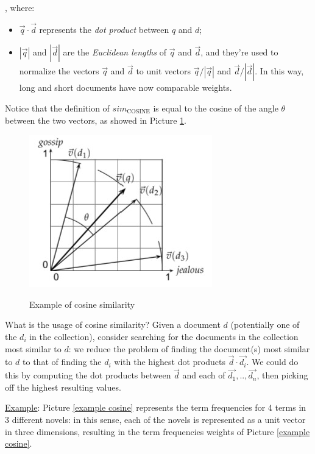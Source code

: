 , where:

\begin{itemize}
    \item $\Vec{q} \cdot \Vec{d}$ represents the \textit{dot product} between $q$ and $d$;
    \item $|\Vec{q}|$ and $|\Vec{d}|$ are the \textit{Euclidean lengths} of $\Vec{q}$ and $\Vec{d}$, and they're used to normalize the vectors $\Vec{q}$ and $\Vec{d}$ to unit vectors $\Vec{q} / |\Vec{q}|$ and $\Vec{d} / |\Vec{d}|$. In this way, long and short documents have now comparable weights.
\end{itemize}

Notice that the definition of $sim_{\text{COSINE}}$ is equal to the cosine of the angle $\theta$ between the two vectors, as showed in Picture \ref{cosine}.

\begin{figure}[h!]
		\centering
		\includegraphics[scale = 2.0]{img/cosine.jpg}
		\label{cosine}
        \caption{Example of cosine similarity}
\end{figure}

What is the usage of cosine similarity?  Given a document $d$ (potentially one of the $d_i$ in the collection), consider searching for the documents in the collection most similar to $d$: we reduce the problem of finding the document(s) most similar to $d$ to that of finding the $d_i$ with the highest dot products $\Vec{d} \cdot \Vec{d_i}$. We could do this by computing the dot products between $\Vec{d}$ and each of $\Vec{d_1},..,\Vec{d_n}$, then picking off the highest resulting values.

\underline{Example}: Picture \ref{example cosine} represents the term frequencies for 4 terms in 3 different novels: in this sense, each of the novels is represented as a unit vector in three dimensions, resulting in the term frequencies weights of Picture \ref{example cosine}.

